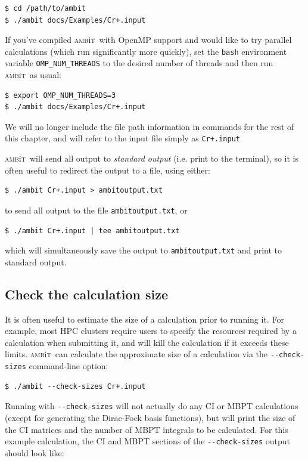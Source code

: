 \documentclass{report}
\newcommand{\ambit}{\textsc{amb}{\footnotesize i}\textsc{t}}
\begin{document}
\begin{verbatim}
$ cd /path/to/ambit
$ ./ambit docs/Examples/Cr+.input
\end{verbatim}

If you've compiled \ambit\  with OpenMP support and would like to try parallel calculations (which run
significantly more quickly), set the \texttt{bash} environment variable \texttt{OMP\_NUM\_THREADS} to
the desired number of threads and then run \ambit\  as usual:

\begin{verbatim}
$ export OMP_NUM_THREADS=3
$ ./ambit docs/Examples/Cr+.input
\end{verbatim}

We will no longer include the file path information in commands for the rest of this chapter, and will
refer to the input file simply as \texttt{Cr+.input}

\ambit\  will send all output to \textit{standard output} (i.e. print to the terminal), so it is often
useful to redirect the output to a file, using either:

\begin{verbatim}
$ ./ambit Cr+.input > ambitoutput.txt
\end{verbatim}

to send all output to the file \texttt{ambitoutput.txt}, or
\begin{verbatim}
$ ./ambit Cr+.input | tee ambitoutput.txt
\end{verbatim}

which will simultaneously save the output to \texttt{ambitoutput.txt} and print to standard output.

\subsection{Check the calculation size}

It is often useful to estimate the size of a calculation prior to running it. For example, most HPC 
clusters require users to specify the resources required by a calculation when submitting it, and will
kill the calculation if it exceeds these limits. \ambit\  can calculate the approximate size of a
calculation via the \texttt{{-}{-}check-sizes} command-line option:

\begin{verbatim}
$ ./ambit --check-sizes Cr+.input
\end{verbatim}

Running with \texttt{{-}{-}check-sizes} will not actually do any CI or MBPT calculations (except for
generating the Dirac-Fock basis functions), but will print the size of the CI matrices and the number of
MBPT integrals to be calculated. For this example calculation, the CI and MBPT sections of the
\texttt{{-}{-}check-sizes} output should look like:
\end{document}
